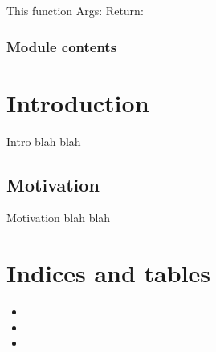 \documentclass[letterpaper,10pt,english,openany,oneside]{sphinxmanual}
\begin{document}
\begin{fulllineitems}
\begin{fulllineitems}
\end{fulllineitems}


\begin{fulllineitems}
\label{\detokenize{nloed:nloed.design.Design._create_grid}}
This function
Args:
Return:

\end{fulllineitems}


\begin{fulllineitems}
\label{\detokenize{nloed:nloed.design.Design._sort_inputs}}
\end{fulllineitems}


\end{fulllineitems}



\subsection{Module contents}
\label{\detokenize{nloed:module-nloed}}\label{\detokenize{nloed:module-contents}}

\chapter{Introduction}
\label{\detokenize{index:introduction}}
Intro blah blah


\section{Motivation}
\label{\detokenize{index:motivation}}
Motivation blah blah


\chapter{Indices and tables}
\label{\detokenize{index:indices-and-tables}}\begin{itemize}
\item {} 

\item {} 

\item {} 

\end{itemize}
\end{document}

